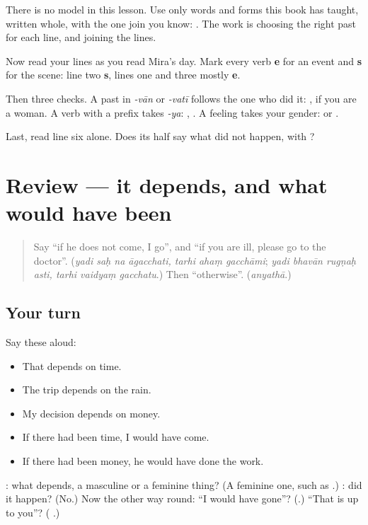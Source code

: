 There is no model in this lesson. Use only words and forms this book has taught, written whole, with the one join you know: \textbf{ }. The work is choosing the right past for each line, and joining the lines.

\begin{tcolorbox}[breakable,colback=teal!4,colframe=teal!35!black,title={Before you move on}]
Now read your lines as you read Mira's day. Mark every verb \textbf{e} for an event and \textbf{s} for the scene: line two \textbf{s}, lines one and three mostly \textbf{e}.

Then three checks. A past in \emph{-vān} or \emph{-vatī} follows the one who did it: \textbf{ }, if you are a woman. A verb with a prefix takes \emph{-ya}: \textbf{}, \textbf{}. A feeling takes your gender: \textbf{} or \textbf{}.

Last, read line six alone. Does its \textbf{} half say what did not happen, with \textbf{}?
\end{tcolorbox}
\section[(review)]{Review — it depends, and what would have been}

\label{lesson:SA-R285-depends-and-would}



\begin{quote}
Say \textquotedblleft{}if he does not come, I go\textquotedblright{}, and \textquotedblleft{}if you are ill, please go to the doctor\textquotedblright{}. (\emph{yadi saḥ na āgacchati, tarhi ahaṃ gacchāmi}; \emph{yadi bhavān rugṇaḥ asti, tarhi vaidyaṃ gacchatu}.) Then \textquotedblleft{}otherwise\textquotedblright{}. (\emph{anyathā}.)
\end{quote}

\subsection*{Your turn}
Say these aloud:

\begin{itemize}
\raggedright
  \item That depends on time.
  \item The trip depends on the rain.
  \item My decision depends on money.
  \item If there had been time, I would have come.
  \item If there had been money, he would have done the work.
\end{itemize}

\begin{tcolorbox}[breakable,colback=teal!4,colframe=teal!35!black,title={Before you move on}]
\textbf{}: what depends, a masculine or a feminine thing? (A feminine one, such as \textbf{}.) \textbf{}: did it happen? (No.) Now the other way round: \textquotedblleft{}I would have gone\textquotedblright{}? (\textbf{}.) \textquotedblleft{}That is up to you\textquotedblright{}? (\textbf{ }.)
\end{tcolorbox}
